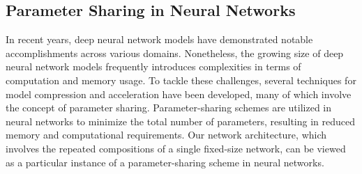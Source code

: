 \documentclass[nohyperref]{article}
\theoremstyle{plain}
\theoremstyle{definition}
\theoremstyle{remark}
\begin{document}
%

\subsection{Parameter Sharing in Neural Networks}
\label{sec:parameter:sharing}



In recent years, deep neural network models have demonstrated 
notable
accomplishments across various domains. Nonetheless, the growing size of deep neural network models frequently introduces complexities in terms of computation and memory usage. To tackle these challenges, several techniques for model compression and acceleration have been developed, many of which involve the concept of parameter sharing.
Parameter-sharing schemes are utilized in neural networks to minimize the total number of parameters, resulting in reduced memory and computational requirements. Our network architecture, which involves the repeated compositions of a single fixed-size network, can be viewed as a particular instance of a parameter-sharing scheme in neural networks.
\end{document}
